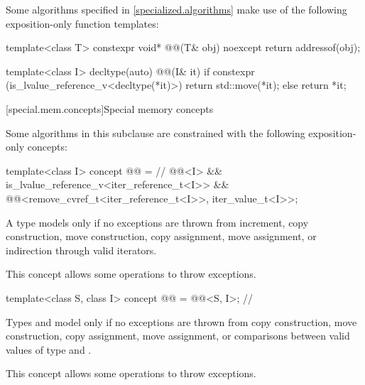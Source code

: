 \pnum
Some algorithms specified in \ref{specialized.algorithms}
make use of the following exposition-only function templates:
\begin{codeblock}
template<class T>
  constexpr void* @@(T& obj) noexcept {
    return addressof(obj);
  }

template<class I>
  decltype(auto) @@(I& it) {
    if constexpr (is_lvalue_reference_v<decltype(*it)>)
      return std::move(*it);
    else
      return *it;
  }
\end{codeblock}

[special.mem.concepts]{Special memory concepts}

\pnum
Some algorithms in this subclause are constrained with the following
exposition-only concepts:
\begin{itemdecl}
template<class I>
concept @@ = // \expos
  @@<I> &&
  is_lvalue_reference_v<iter_reference_t<I>> &&
  @@<remove_cvref_t<iter_reference_t<I>>, iter_value_t<I>>;
\end{itemdecl}

\begin{itemdescr}
\pnum
A type  models  only if
no exceptions are thrown from increment,
copy construction, move construction,
copy assignment, move assignment,
or indirection through valid iterators.

\pnum
\begin{note}
This concept allows some 
operations to throw exceptions.
\end{note}
\end{itemdescr}

\begin{itemdecl}
template<class S, class I>
concept @@ = @@<S, I>; // \expos
\end{itemdecl}

\begin{itemdescr}
\pnum
Types  and  model 
only if no exceptions are thrown from copy construction, move construction,
copy assignment, move assignment, or comparisons between
valid values of type  and .

\pnum
\begin{note}
This concept allows some 
operations to throw exceptions.
\end{note}
\end{itemdescr}

